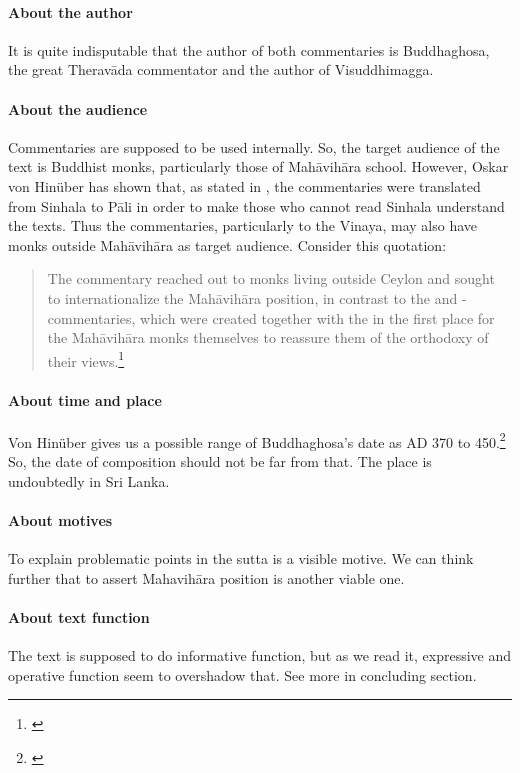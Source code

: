 \paragraph*{About the author} It is quite indisputable that the author of both commentaries is Buddhaghosa, the great Therav\=ada commentator and the author of Visuddhimagga.

\paragraph*{About the audience} Commentaries are supposed to be used internally. So, the target audience of the text is Buddhist monks, particularly those of Mah\=avih\=ara school. However, Oskar von Hin\"uber has shown that, as stated in , the commentaries were translated from Sinhala to P\=ali in order to make those who cannot read Sinhala understand the texts. Thus the commentaries, particularly to the Vinaya, may also have monks outside Mah\=avih\=ara as target audience. Consider this quotation:
\begin{quote}
The  commentary reached out to monks living outside Ceylon and sought to internationalize the Mah\=avih\=ara position, in contrast to the  and -commentaries, which were created together with the  in the first place for the Mah\=avih\=ara monks themselves to reassure them of the orthodoxy of their views.\footnote{\citealp[p.~123]{hinuber:translating}}
\end{quote}

\paragraph*{About time and place} Von Hin\"uber gives us a possible range of Buddhaghosa's date as AD 370 to 450.\footnote{\citealp[p.~103]{hinuber:literature}} So, the date of composition should not be far from that. The place is undoubtedly in Sri Lanka.

\paragraph*{About motives} To explain problematic points in the sutta is a visible motive. We can think further that to assert Mahavih\=ara position is another viable one.

\paragraph*{About text function} The text is supposed to do informative function, but as we read it, expressive and operative function seem to overshadow that. See more in concluding section.

